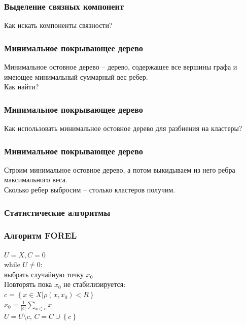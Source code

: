 \documentclass[12pt]{beamer}
\begin{document}
\begin{frame}\frametitle{Выделение связных компонент}
Как искать компоненты связности?
\end{frame}

\begin{frame}\frametitle{Минимальное покрывающее дерево}
Минимальное остовное дерево -- дерево, содержащее все вершины графа и имеющее минимальный суммарный вес ребер.\\
\vspace{5mm}
Как найти?
\end{frame}

\begin{frame}\frametitle{Минимальное покрывающее дерево}
Как использовать минимальное остовное дерево для разбиения на кластеры?
\end{frame}
\begin{frame}\frametitle{Минимальное покрывающее дерево}
Строим минимальное остовное дерево, а потом выкидываем из него ребра максимального веса.\\
\vspace{5mm}
Сколько ребер выбросим -- столько кластеров получим.
\end{frame}

\begin{frame}\frametitle{Статистические алгоритмы}
\end{frame}

\begin{frame}\frametitle{Алгоритм FOREL}

${U = X, C = 0}$\\\vspace{2mm}
while ${U \neq 0}$:\\
\hspace{5mm} выбрать случайную точку $x_0$\\
\vspace{2mm}
\hspace{5mm} Повторять пока $x_0$ не стабилизируется:\\
\vspace{2mm}
\hspace{10mm} ${c = \left\{ x \in X \vert \rho(x, x_0) < R \right\}}$ \\
\vspace{2mm}
\hspace{10mm} $x_0 = \frac{1}{\vert c \vert} \sum_{x \in c} x$\\
\vspace{2mm}
\hspace{5mm} ${U = U \setminus c}$, ${C = C \cup \left\{ c \right\}}$
\end{frame}
\end{document}
